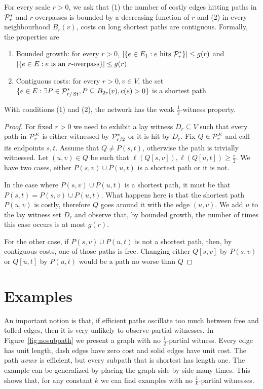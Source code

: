 \documentclass[letterpaper,11pt]{article}
\begin{document}
For every scale $r>0$, we ask that (1) the number of costly edges hitting paths in $\mathcal{P}^*_r$ and $r$-overpasses is bounded by a decreasing function of $r$ and (2) in every neighbourhood $B_r(v)$, costs on long shortest paths are contiguous.
Formally, the properties are
\begin{enumerate}
\item Bounded growth: for every $r>0$, $\lvert\{e\in E_1: e \text{ hits } \mathcal{P}^*_r\}\rvert\leq g(r)$ and $\lvert\{e\in E: e \text{ is an $r$-overpass}\}\rvert\leq g(r)$
\item Contiguous costs: for every $r>0, v\in V$, the set $\{e\in E: \exists P\in\mathcal{P}^*_{r/\operatorname{St}}, P\subseteq B_{2r}(v), c(e)>0\}$ is a shortest path
\end{enumerate}

\begin{proposition}
With conditions (1) and (2), the network has the weak $\frac{1}{2}$-witness property.
\end{proposition}
\begin{proof}
For fixed $r>0$ we need to exhibit a lay witness $D_r\subseteq V$ such that every path in $\mathcal{P}^E_r$ is either witnessed by $\mathcal{P}^*_{r/2}$ or it is hit by $D_r$.
Fix $Q\in\mathcal{P}^E_r$ and call its endpoints $s,t$.
Assume that $Q\neq P(s,t)$, otherwise the path is trivially witnessed.
Let $(u,v)\in Q$ be such that $\ell(Q[s,v]),\ell(Q[u,t])\geq \frac{r}{2}$.
We have two cases, either $P(s,v)\cup P(u,t)$ is a shortest path or it is not.

In the case where $P(s,v)\cup P(u,t)$ is a shortest path, it must be that $P(s,t)=P(s,v)\cup P(u,t)$.
What happens here is that the shortest path $P(u,v)$ is costly, therefore $Q$ goes around it with the edge $(u,v)$.
We add $u$ to the lay  witness set $D_r$ and observe that, by bounded growth, the number of times this case occurs is at most $g(r)$.

For the other case, if $P(s,v)\cup P(u,t)$ is not a shortest path, then, by contiguous costs, one of those paths is free.
Changing either $Q[s,v]$ by $P(s,v)$ or $Q[u,t]$ by $P(u,t)$ would be a path no worse than $Q$ 
\end{proof}

\section{Examples}

An important notion is that, if efficient paths oscillate too much between free and tolled edges, then it is very unlikely to observe partial witnesses.
In Figure~\ref{fig:nosubpath} we present a graph with no $\frac{1}{2}$-partial witness.
Every edge has unit length, dash edges have zero cost and solid edges have unit cost.
The path $uvwx$ is efficient, but every subpath that is shortest has length one.
The example can be generalized by placing the graph side by side many times.
This shows that, for any constant $k$ we can find examples with no $\frac{1}{k}$-partial witnesses.
\end{document}
